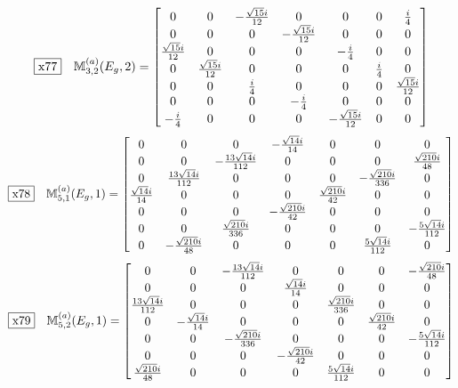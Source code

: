 \documentclass[fleqn,10pt,landscape]{jsarticle}
\begin{document}
\begin{dmath*}
\fbox{x77}\quad \mathbb{M}_{3,2}^{(a)}(E_{g},2)=\begin{bmatrix} 0 & 0 & - \frac{\sqrt{15} i}{12} & 0 & 0 & 0 & \frac{i}{4} \\ 0 & 0 & 0 & - \frac{\sqrt{15} i}{12} & 0 & 0 & 0 \\ \frac{\sqrt{15} i}{12} & 0 & 0 & 0 & - \frac{i}{4} & 0 & 0 \\ 0 & \frac{\sqrt{15} i}{12} & 0 & 0 & 0 & \frac{i}{4} & 0 \\ 0 & 0 & \frac{i}{4} & 0 & 0 & 0 & \frac{\sqrt{15} i}{12} \\ 0 & 0 & 0 & - \frac{i}{4} & 0 & 0 & 0 \\ - \frac{i}{4} & 0 & 0 & 0 & - \frac{\sqrt{15} i}{12} & 0 & 0 \end{bmatrix}
\end{dmath*}
\begin{dmath*}
\fbox{x78}\quad \mathbb{M}_{5,1}^{(a)}(E_{g},1)=\begin{bmatrix} 0 & 0 & 0 & - \frac{\sqrt{14} i}{14} & 0 & 0 & 0 \\ 0 & 0 & - \frac{13 \sqrt{14} i}{112} & 0 & 0 & 0 & \frac{\sqrt{210} i}{48} \\ 0 & \frac{13 \sqrt{14} i}{112} & 0 & 0 & 0 & - \frac{\sqrt{210} i}{336} & 0 \\ \frac{\sqrt{14} i}{14} & 0 & 0 & 0 & \frac{\sqrt{210} i}{42} & 0 & 0 \\ 0 & 0 & 0 & - \frac{\sqrt{210} i}{42} & 0 & 0 & 0 \\ 0 & 0 & \frac{\sqrt{210} i}{336} & 0 & 0 & 0 & - \frac{5 \sqrt{14} i}{112} \\ 0 & - \frac{\sqrt{210} i}{48} & 0 & 0 & 0 & \frac{5 \sqrt{14} i}{112} & 0 \end{bmatrix}
\end{dmath*}
\begin{dmath*}
\fbox{x79}\quad \mathbb{M}_{5,2}^{(a)}(E_{g},1)=\begin{bmatrix} 0 & 0 & - \frac{13 \sqrt{14} i}{112} & 0 & 0 & 0 & - \frac{\sqrt{210} i}{48} \\ 0 & 0 & 0 & \frac{\sqrt{14} i}{14} & 0 & 0 & 0 \\ \frac{13 \sqrt{14} i}{112} & 0 & 0 & 0 & \frac{\sqrt{210} i}{336} & 0 & 0 \\ 0 & - \frac{\sqrt{14} i}{14} & 0 & 0 & 0 & \frac{\sqrt{210} i}{42} & 0 \\ 0 & 0 & - \frac{\sqrt{210} i}{336} & 0 & 0 & 0 & - \frac{5 \sqrt{14} i}{112} \\ 0 & 0 & 0 & - \frac{\sqrt{210} i}{42} & 0 & 0 & 0 \\ \frac{\sqrt{210} i}{48} & 0 & 0 & 0 & \frac{5 \sqrt{14} i}{112} & 0 & 0 \end{bmatrix}
\end{dmath*}
\end{document}
